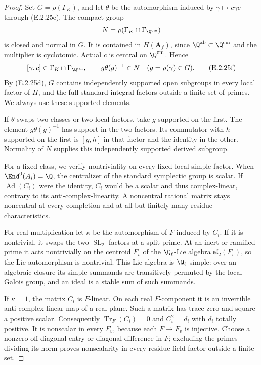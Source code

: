 \begin{proof}
Set \(G=\rho(\Gamma_K)\), and let \(\theta\) be
the automorphism induced by \(\gamma\mapsto c\gamma c\)
through (E.2.25e). The compact group
\[
 N=\rho(\Gamma_K\cap\Gamma_{\Q^{\mathrm{cm}}})
\]
is closed and normal in \(G\). It is contained in
\(H(\mathbf A_f)\), since
\(\Q^{\mathrm{ab}}\subset\Q^{\mathrm{cm}}\) and
the multiplier is cyclotomic. Actual \(c\) is
central on \(\Q^{\mathrm{cm}}\). Hence
\[
 [\gamma,c]\in\Gamma_K\cap\Gamma_{\Q^{\mathrm{cm}}},
 \qquad g\theta(g)^{-1}\in N
                \quad(g=\rho(\gamma)\in G).
 \tag{E.2.25f}
\]
By (E.2.25d), \(G\) contains independently supported
open subgroups in every local factor of \(H\), and
the full standard integral factors outside a finite
set of primes. We always use these supported elements.

If \(\theta\) swaps two classes or two local factors,
take \(g\) supported on the first. The element
\(g\theta(g)^{-1}\) has support in the two factors.
Its commutator with \(h\) supported on the first
is \([g,h]\) in that factor and the identity in
the other. Normality of \(N\) supplies this
independently supported derived subgroup.

For a fixed class, we verify nontriviality on every
fixed local simple factor. When \(\End^0(A_i)=\Q\),
the centralizer of the standard symplectic group
is scalar. If \(\operatorname{Ad}(C_i)\) were the
identity, \(C_i\) would be a scalar and thus
complex-linear, contrary to its anti-complex-linearity.
A noncentral rational matrix stays noncentral at
every completion and at all but finitely many
residue characteristics.

For real multiplication let \(\kappa\) be the
automorphism of \(F\) induced by \(C_i\). If it is
nontrivial, it swaps the two \(\operatorname{SL}_2\)
factors at a split prime. At an inert or ramified
prime it acts nontrivially on the centroid \(F_v\)
of the \(\Q_\ell\)-Lie algebra
\(\mathfrak{sl}_2(F_v)\), so the Lie automorphism
is nontrivial. This Lie algebra is \(\Q_\ell\)-simple:
over an algebraic closure its simple summands are
transitively permuted by the local Galois group,
and an ideal is a stable sum of such summands.

If \(\kappa=1\), the matrix \(C_i\) is \(F\)-linear.
On each real \(F\)-component it is an invertible
anti-complex-linear map of a real plane. Such a
matrix has trace zero and square a positive scalar.
Consequently
\(\operatorname{Tr}_F(C_i)=0\) and \(C_i^2=d_i\)
with \(d_i\) totally positive. It is nonscalar
in every \(F_v\), because each \(F\to F_v\) is
injective. Choose a nonzero off-diagonal entry or
diagonal difference in \(F\); excluding the primes
dividing its norm proves nonscalarity in every
residue-field factor outside a finite set.


\end{proof}
